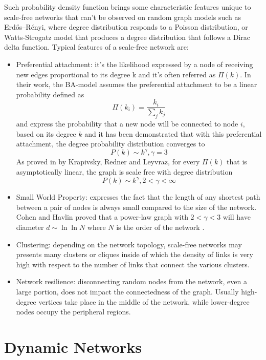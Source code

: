 	Such probability density function brings some characteristic features unique to scale-free networks that can't be observed on random graph models such as Erdős–Rényi, where degree distribution responds to a Poisson distribution, or Watts-Strogatz model that produces a degree distribution that follows a Dirac delta function. Typical features of a scale-free network are:
	\begin{itemize}
		\item Preferential attachment: it's the likelihood expressed by a node of receiving new edges proportional to its degree k and it's often referred as $\Pi(k)$. In their work, the BA-model assumes the preferential attachment to be a linear probability defined as $$\Pi(k_i) = \frac{k_i}{\sum_{j}k_j}$$ and express the probability that a new node will be connected to node $i$, based on its degree $k$ and it has been demonstrated that with this preferential attachment, the degree probability distribution converges to $$P(k) \sim k^{\gamma}, \gamma = 3$$
		As proved in \cite{Krapivsky2000} by Krapivsky, Redner and Leyvraz, for every $\Pi(k)$ that is asymptotically linear, the graph is scale free with degree distribution $$P(k) \sim k^{\gamma}, 2 < \gamma < \infty $$
		
		\item  Small World Property: expresses the fact that the length of any shortest path between a pair of nodes is always small compared to the size of the network. Cohen and Havlin proved that a power-law graph with $2 < \gamma < 3$ will have diameter $d \sim \ln\ln N$ where $N$ is the order of the network \cite{Cohen2002}. 
		
		\item Clustering: depending on the network topology, scale-free networks may presents many clusters or cliques inside of which the density of links is very high with respect to the number of links that connect the various clusters.
		
		\item Network resilience: disconnecting random nodes from the network, even a large portion, does not impact the connectedness of the graph. Usually high-degree vertices take place in the middle of the network, while lower-degree nodes occupy the peripheral regions.
	\end{itemize}
	
	\section{Dynamic Networks}
	
